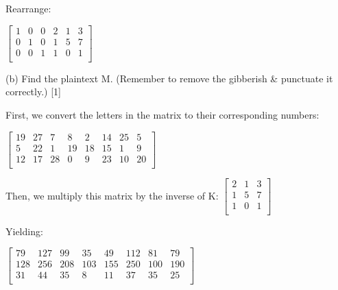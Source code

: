 \documentclass[12pt,emtex]{article}
\begin{document}
\begin{enumerate}
            Rearrange:

            $
            \left[
            	\begin{array}{ccc|ccc}
                    1	&	0	& 0 & 2 & 1 & 3 \\
                    0 & 1 &	0 & 1 & 5 & 7 \\
                    0	&	0	& 1 & 1 & 0 & 1 \\
                \end{array}
            \right]
            $
            
                \pagebreak

            

            
      

        

        
            (b)	Find the plaintext M.	(Remember to remove the gibberish \& punctuate it correctly.)	
                						\hfill       [1]

            First, we convert the letters in the matrix to their corresponding numbers:
            
            $
            \left[
            \begin{array}{cccccccc}
              19	&	27 &	7  &	8  &	2	&	14	&	25	&	5	\\
              5 	&	22 &	1  &	19 &	18	&	15	&	1	&	9	\\
              12	&	17	&	28	&	0	&	9	&	23	&	10	&	20	\\
           \end{array}
            \right]
            $

            Then, we multiply this matrix by the inverse of K:
            $
            \left[
            	\begin{array}{ccc}
                    2 & 1 & 3 \\
                    1 & 5 & 7 \\
                    1 & 0 & 1 \\
                \end{array}
            \right]
            $

            Yielding:

            $
            \left[
            \begin{array}{cccccccc}
              79	&	127 &	99  &	35  &	49	&	112 &	81	&	79	\\
              128 &	256 &	208  &	103 &	155	&	250	&	100	&	190	\\
              31	&	44	&	35	&	8	&	11	&	37	&	35	&	25	\\
           \end{array}
            \right]
            $


\end{enumerate}
\end{document}
